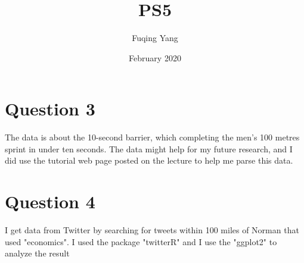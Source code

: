 \documentclass{article}
\title{PS5}
\author{Fuqing Yang }
\date{February 2020}
\begin{document}
\maketitle

\section{Question 3}
The data is about the 10-second barrier, which completing the men's 100 metres sprint in under ten seconds. The data might help for my future research, and I did use the tutorial web page posted on the lecture to help me parse this data.\\

\section{Question 4}
I get data from Twitter by searching for tweets within 100 miles of Norman that used "economics". I used the package "twitterR" and I use the "ggplot2" to analyze the result 
\end{document}
